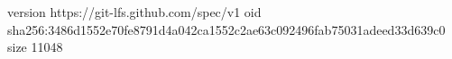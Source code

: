 version https://git-lfs.github.com/spec/v1
oid sha256:3486d1552e70fe8791d4a042ca1552c2ae63c092496fab75031adeed33d639c0
size 11048
